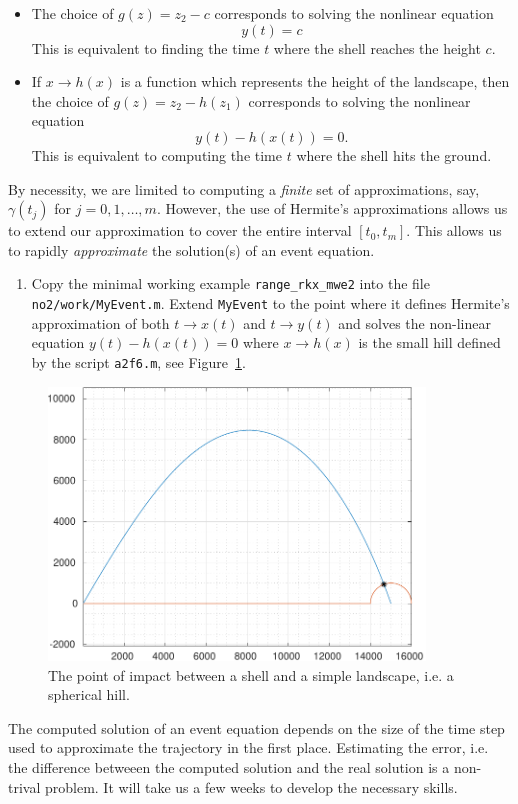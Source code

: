 \documentclass[a4paper,12pt]{article}
\newcounter{problem}
\newcounter{remark}
\newenvironment{remark}{\refstepcounter{remark} \vspace{0.1cm} \par \noindent {\bf Remark \arabic{remark}}}{\vspace{0.3cm}}
\newcommand{\bes}{\begin{equation*}}
\newcommand{\ees}{\end{equation*}}
\newcommand{\be}{\begin{equation}}
\newcommand{\ee}{\end{equation}}
\begin{document}
   \begin{itemize}
   \item The choice of $g(z) = z_2 - c$ corresponds to solving the nonlinear equation
     \be
     y(t) = c
     \ee
     This is equivalent to finding the time $t$ where the shell reaches the height $c$. 
   \item If $x \rightarrow h(x)$ is a function which represents the height of the landscape, then the choice of $g(z) = z_2 - h(z_1)$ corresponds to solving the nonlinear equation
     \bes
     y(t) - h(x(t)) = 0.
     \ees
     This is equivalent to computing the time $t$ where the shell hits the ground.
   \end{itemize}
   By necessity, we are limited to computing a \textit{finite} set of approximations, say, $\gamma(t_j)$ for $j=0,1,\dots,m$. However, the use of Hermite's approximations allows us to extend our approximation to cover the entire interval $[t_0,t_m]$. This allows us to rapidly \textit{approximate} the solution(s) of an event equation.

   \begin{enumerate}
   \item Copy the minimal working example {\tt range\_rkx\_mwe2} into the file {\tt no2/work/MyEvent.m}. Extend {\tt MyEvent} to the point where it defines Hermite's approximation of both $t \rightarrow x(t)$ and $t \rightarrow y(t)$ and solves the non-linear equation $y(t) - h(x(t)) = 0$ where $x \rightarrow h(x) $ is the small hill defined by the script {\tt a2f6.m}, see Figure~\ref{fig:MyEvent}.
   \end{enumerate}

\begin{figure}
    \centering
    \includegraphics[width=10cm]{MyEvent.pdf} \caption[The point of impact between a shell and a simple landscape]{The point of impact between a shell and a simple landscape, i.e. a spherical hill.} \label{fig:MyEvent}
    \end{figure}

    \begin{remark} The computed solution of an event equation depends on the size of the time step used to approximate the trajectory in the first place. Estimating the error, i.e. the difference betweeen the computed solution and the real solution is a non-trival problem. It will take us a few weeks to develop the necessary skills.
   \end{remark}

   
   



  
\end{document}
